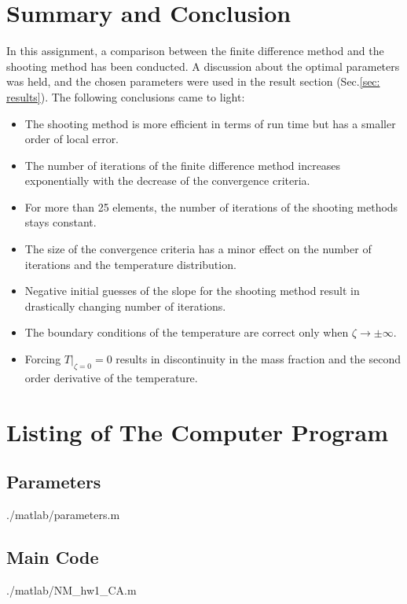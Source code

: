 \documentclass[11pt, a4paper]{article}
\begin{document}
\section{Summary and Conclusion}
In this assignment, a comparison between the finite difference method and the shooting method has been conducted. A discussion about the optimal parameters was held, and the chosen parameters were used in the result section (Sec.\ref{sec: results}). The following conclusions came to light:
\begin{itemize}
    \item The shooting method is more efficient in terms of run time but has a smaller order of local error.
    \item The number of iterations of the finite difference method increases exponentially with the decrease of the convergence criteria.
    \item For more than 25 elements, the number of iterations of the shooting methods stays constant.
    \item The size of the convergence criteria has a minor effect on the number of iterations and the temperature distribution.
    \item Negative initial guesses of the slope for the shooting method result in drastically changing number of iterations.
    \item The boundary conditions of the temperature are correct only when $\zeta\rightarrow\pm\infty$.
    \item Forcing $\left.T\right|_{\zeta=0}=0$ results in discontinuity in the mass fraction and the second order derivative of the temperature.
\end{itemize}

\newpage
\appendix
\section{Listing of The Computer Program}
\subsection{Parameters}
\begin{lstinputlisting}[captionpos=b,stringstyle=\color{magenta},frame=single, numbers=left, style=MatLab-editor, basicstyle=\mlttfamily\small, caption={Parameters file},mlshowsectionrules=true]{./matlab/parameters.m}
\end{lstinputlisting}

\subsection{Main Code}
\begin{lstinputlisting}[captionpos=b,stringstyle=\color{magenta},frame=single, numbers=left, style=MatLab-editor, basicstyle=\mlttfamily\small, caption={The main file},mlshowsectionrules=true]{./matlab/NM_hw1_CA.m}
\end{lstinputlisting}
\end{document}
